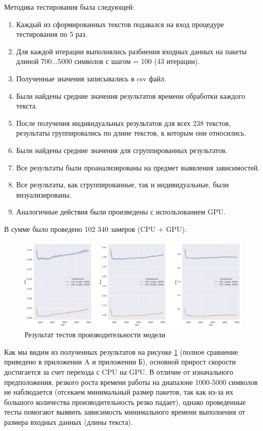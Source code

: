 Методика тестирования была следующей:
\begin{enumerate}
  \item Каждый из сформированных текстов подавался на вход процедуре тестирования по 5 раз.
  \item Для каждой итерации выполнялись разбиения входных данных на пакеты длиной 700...5000 символов с шагом = 100 (43 итерации).
  \item Полученные значения записывались в csv файл.
  \item Были найдены средние значения результатов времени обработки каждого текста. 
  \item После получения индивидуальных результатов для всех 238 текстов, результаты группировались по длине текстов, к которым они относились.
  \item Были найдены средние значения для сгруппированных результатов. 
  \item Все результаты были проанализированы на предмет выявления зависимостей.
  \item Все результаты, как сгруппированные, так и индивидуальные, были визуализированы.
  \item Аналогичные действия были произведены с использованием GPU. 
\end{enumerate}

В сумме было проведено 102 340 замеров (CPU + GPU).

\begin{figure}[ht]
\centering
\includegraphics[width=\textwidth]{img/in_text_compare}
\caption{\label{fig:in_text_compare}Результат тестов производительности модели}
\end{figure}

Как мы видим из полученных результатов на рисунке \ref{fig:in_text_compare} (полное сравнение приведено в приложении A и приложении Б), основной прирост скорости достигается за счет перехода с CPU на GPU. В отличие от изначального предположения, резкого роста времени работы на диапазоне 1000-5000 символов не наблюдается (отсекаем минимальный размер пакетов, так как из-за их большого количества производительность резко падает), однако проведенные тесты помогают выявить зависимость минимального времени выполнения от размера входных данных (длины текста). 

